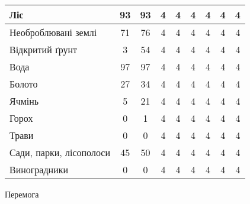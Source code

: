 \begin{table}[!ht]
\begin{tabular}{|K|C|C|C|C|C|C|C|C|}
        \hline Ліс                     & 93                              & 93                              & 4     & 4 & 4     & 4 & 4     & 4 \\
        \hline Необроблювані землі     & 71                              & 76                              & 4     & 4 & 4     & 4 & 4     & 4 \\
        \hline Відкритий ґрунт         & 3                               & 54                              & 4     & 4 & 4     & 4 & 4     & 4 \\
        \hline Вода                    & 97                              & 97                              & 4     & 4 & 4     & 4 & 4     & 4 \\
        \hline Болото                  & 27                              & 34                              & 4     & 4 & 4     & 4 & 4     & 4 \\
        \hline Ячмінь                  & 5                               & 21                              & 4     & 4 & 4     & 4 & 4     & 4 \\
        \hline Горох                   & 0                               & 1                               & 4     & 4 & 4     & 4 & 4     & 4 \\
        \hline Трави                   & 0                               & 0                               & 4     & 4 & 4     & 4 & 4     & 4 \\
        \hline Сади, парки, лісополоси & 45                              & 50                              & 4     & 4 & 4     & 4 & 4     & 4 \\
        \hline Виноградники            & 0                               & 0                               & 4     & 4 & 4     & 4 & 4     & 4 \\
        \hline
    \end{tabular}
    \label{tab:segm_result_augm_per_classes}
\end{table}

\chapconclude{\ref{chap:practice}}
Перемога
